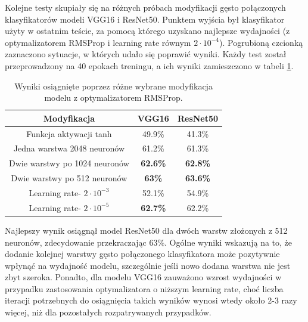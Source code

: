 Kolejne testy skupiały się na różnych próbach modyfikacji gęsto połączonych klasyfikatorów modeli VGG16 i ResNet50. Punktem wyjścia był klasyfikator użyty w ostatnim teście, za pomocą którego uzyskano najlepsze wydajności (z optymalizatorem RMSProp i learning rate równym $2\cdot10^{-4}$). Pogrubioną czcionką zaznaczono sytuacje, w których udało się poprawić wyniki. Każdy test został przeprowadzony na 40 epokach treningu, a ich wyniki zamieszczono w tabeli \ref{tab:5.14}.

\begin{table}[H]
  \centering
  \caption{Wyniki osiągnięte poprzez różne wybrane modyfikacja modelu z optymalizatorem RMSProp.}
    \begin{tabular}{ |c|c|c| }
    \hline
    Modyfikacja & VGG16 & ResNet50 \\
    \hline
    Funkcja aktywacji tanh & 49.9\% & 41.3\% \\ 
    Jedna warstwa 2048 neuronów & 61.2\% & 61.3\% \\
    Dwie warstwy po 1024 neuronów & \textbf{62.6\%} & \textbf{62.8\%} \\
    Dwie warstwy po 512 neuronów & \textbf{63\%} & \textbf{63.6\%} \\
    Learning rate- $2\cdot10^{-3}$ & 52.1\% & 54.9\% \\
    Learning rate- $2\cdot10^{-5}$ & \textbf{62.7\%} & 62.2\% \\
    \hline
    \end{tabular}
  \label{tab:5.14}
\end{table}

Najlepszy wynik osiągnął model ResNet50 dla dwóch warstw złożonych z 512 neuronów, zdecydowanie przekraczając 63\%. Ogólne wyniki wskazują na to, że dodanie kolejnej warstwy gęsto połączonego klasyfikatora może pozytywnie wpłynąć na wydajność modelu, szczególnie jeśli nowo dodana warstwa nie jest zbyt szeroka. Ponadto, dla modelu VGG16 zauważono wzrost wydajności w przypadku zastosowania optymalizatora o niższym learning rate, choć liczba iteracji potrzebnych do osiągnięcia takich wyników wynosi wtedy około 2-3 razy więcej, niż dla pozostałych rozpatrywanych przypadków.

